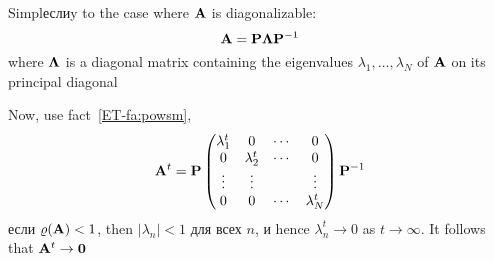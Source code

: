 \begin{frame}
    
    \vspace{2em}
    Simplеслиy to the case where $\mathbf A$ is diagonalizable:
        $$\mathbf A = \mathbf P {\boldsymbol \Lambda} \mathbf P^{-1}$$
    where ${\boldsymbol \Lambda}$ is a diagonal
    matrix containing the eigenvalues $\lambda_1, \ldots, \lambda_N$ of $\mathbf A$
    on its principal diagonal

    \vspace{.7em}
    Now, use fact~\ref{ET-fa:powsm},
    \begin{equation*}
        \mathbf A^t
        = \mathbf P
        \left(
        \begin{matrix}
            \lambda_1^t & 0 & \cdots & 0 \\
            0 & \lambda_2^t & \cdots & 0 \\
            \vdots & \vdots &  & \vdots \\
            0 & 0 & \cdots & \lambda_N^t \\
        \end{matrix}
        \right)
        \mathbf P^{-1}
    \end{equation*}
    если $\varrho(\mathbf A) < 1$, then $|\lambda_n| < 1$ для всех $n$, и hence
    $\lambda_n^t \to 0$ as $t \to \infty$. It follows that $\mathbf A^t \to
    {\mathbf 0}$ 
    
\end{frame}





